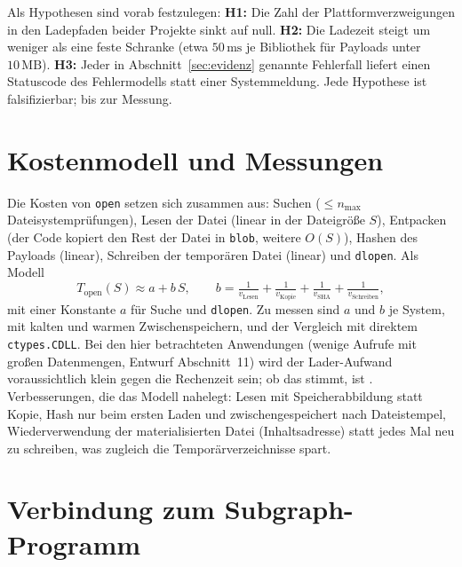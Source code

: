 Als Hypothesen sind vorab festzulegen: \textbf{H1:} Die Zahl der Plattformverzweigungen in den Ladepfaden beider Projekte sinkt auf null. \textbf{H2:} Die Ladezeit steigt um weniger als eine feste Schranke (etwa $50\,\mathrm{ms}$ je Bibliothek für Payloads unter $10\,\mathrm{MB}$). \textbf{H3:} Jeder in Abschnitt~\ref{sec:evidenz} genannte Fehlerfall liefert einen Statuscode des Fehlermodells statt einer Systemmeldung. Jede Hypothese ist falsifizierbar;  bis zur Messung.

\section{Kostenmodell und Messungen}

Die Kosten von \texttt{open} setzen sich zusammen aus: Suchen ($\le n_{\max}$ Dateisystemprüfungen), Lesen der Datei (linear in der Dateigröße $S$), Entpacken (der Code kopiert den Rest der Datei in \texttt{blob}, weitere $O(S)$), Hashen des Payloads (linear), Schreiben der temporären Datei (linear) und \texttt{dlopen}. Als Modell
\[
T_{\mathrm{open}}(S)\approx a+b\,S,\qquad b=\tfrac{1}{v_{\mathrm{Lesen}}}+\tfrac{1}{v_{\mathrm{Kopie}}}+\tfrac{1}{v_{\mathrm{SHA}}}+\tfrac{1}{v_{\mathrm{Schreiben}}},
\]
mit einer Konstante $a$ für Suche und \texttt{dlopen}. Zu messen sind $a$ und $b$ je System, mit kalten und warmen Zwischenspeichern, und der Vergleich mit direktem \texttt{ctypes.CDLL}. Bei den hier betrachteten Anwendungen (wenige Aufrufe mit großen Datenmengen, Entwurf Abschnitt~11) wird der Lader-Aufwand voraussichtlich klein gegen die Rechenzeit sein; ob das stimmt, ist . Verbesserungen, die das Modell nahelegt: Lesen mit Speicherabbildung statt Kopie, Hash nur beim ersten Laden und zwischengespeichert nach Dateistempel, Wiederverwendung der materialisierten Datei (Inhaltsadresse) statt jedes Mal neu zu schreiben, was zugleich die Temporärverzeichnisse spart.

\section{Verbindung zum Subgraph-Programm}

